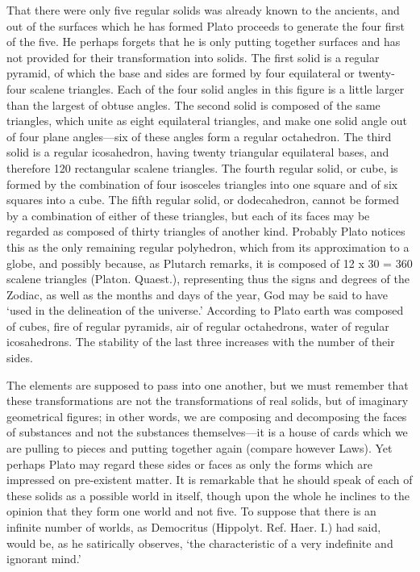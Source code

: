 That there were only five regular solids was already known to the
ancients, and out of the surfaces which he has formed Plato proceeds to
generate the four first of the five. He perhaps forgets that he is only
putting together surfaces and has not provided for their transformation
into solids. The first solid is a regular pyramid, of which the base and
sides are formed by four equilateral or twenty-four scalene triangles.
Each of the four solid angles in this figure is a little larger than the
largest of obtuse angles. The second solid is composed of the same
triangles, which unite as eight equilateral triangles, and make one solid
angle out of four plane angles—six of these angles form a regular
octahedron. The third solid is a regular icosahedron, having twenty
triangular equilateral bases, and therefore 120 rectangular scalene
triangles. The fourth regular solid, or cube, is formed by the combination
of four isosceles triangles into one square and of six squares into a
cube. The fifth regular solid, or dodecahedron, cannot be formed by a
combination of either of these triangles, but each of its faces may be
regarded as composed of thirty triangles of another kind. Probably Plato
notices this as the only remaining regular polyhedron, which from its
approximation to a globe, and possibly because, as Plutarch remarks, it is
composed of 12 x 30 = 360 scalene triangles (Platon. Quaest.),
representing thus the signs and degrees of the Zodiac, as well as the
months and days of the year, God may be said to have ‘used in the
delineation of the universe.’ According to Plato earth was composed of
cubes, fire of regular pyramids, air of regular octahedrons, water of
regular icosahedrons. The stability of the last three increases with the
number of their sides.

The elements are supposed to pass into one another, but we must remember
that these transformations are not the transformations of real solids, but
of imaginary geometrical figures; in other words, we are composing and
decomposing the faces of substances and not the substances themselves—it
is a house of cards which we are pulling to pieces and putting together
again (compare however Laws). Yet perhaps Plato may regard these sides or
faces as only the forms which are impressed on pre-existent matter. It is
remarkable that he should speak of each of these solids as a possible
world in itself, though upon the whole he inclines to the opinion that
they form one world and not five. To suppose that there is an infinite
number of worlds, as Democritus (Hippolyt. Ref. Haer. I.) had said, would
be, as he satirically observes, ‘the characteristic of a very indefinite
and ignorant mind.’


